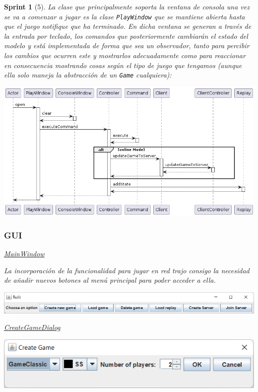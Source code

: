 \documentclass{article}
\theoremstyle{break}
\newtheorem*{sprint}{Sprint}
\begin{document}
\begin{sprint}[5]
La clase que principalmente soporta la ventana de consola una vez se va a comenzar a jugar es la clase \texttt{PlayWindow} que se mantiene abierta hasta que el juego notifique que ha terminado. En dicha ventana se generan a través de la entrada por teclado, los comandos que posteriormente cambiarán el estado del modelo y está implementada de forma que sea un observador, tanto para percibir los cambios que ocurren este y mostrarlos adecuadamente como para reaccionar en consecuencia mostrando cosas según el tipo de juego que tengamos (aunque ella solo maneja la abstracción de un \texttt{Game} cualquiera):
\begin{center}
\includegraphics[scale=0.5]{PlayWindow_sprint5_seq}
\end{center}



\subsubsection{GUI}
\underline{MainWindow}

La incorporación de la funcionalidad para jugar en red trajo consigo  la necesidad de añadir nuevos botones al menú principal para poder acceder a ella.

\begin{center}
\includegraphics[scale=0.6]{menu-sprint5.png}
\end{center}

\underline{CreateGameDialog}

\begin{center}
\includegraphics[scale=0.8]{create-game-sprint5.png}
\end{center}


\end{sprint}
\end{document}

